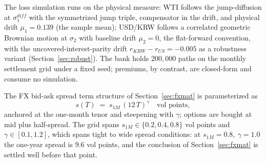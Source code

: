 \documentclass[11pt,a4paper]{article}
\begin{document}
The loss simulation runs on the physical measure: WTI follows the jump-diffusion at $\sigma_1^{diff}$ with the symmetrized jump triple, compensator in the drift, and physical drift $\mu_1=0.139$ (the sample mean); USD/KRW follows a correlated geometric Brownian motion at $\sigma_2$ with baseline drift $\mu_2=0$, the flat-forward convention, with the uncovered-interest-parity drift $r_{KRW}-r_{US}=-0.005$ as a robustness variant (Section~\ref{sec:robust}). The bank holds $200{,}000$ paths on the monthly settlement grid under a fixed seed; premiums, by contrast, are closed-form and consume no simulation.

The FX bid-ask spread term structure of Section~\ref{sec:fxmat} is parameterized as
\begin{equation}
s(T) \;=\; s_{1M}\,(12\,T)^{\gamma}\quad\text{vol points},
\label{eq:spread}
\end{equation}
anchored at the one-month tenor and steepening with $\gamma$; options are bought at mid plus half-spread. The grid spans $s_{1M}\in\{0.2,0.4,0.8\}$ vol points and $\gamma\in[0.1,1.2]$, which spans tight to wide spread conditions: at $s_{1M}=0.8,\ \gamma=1.0$ the one-year spread is $9.6$ vol points, and the conclusion of Section~\ref{sec:fxmat} is settled well before that point.
\end{document}
